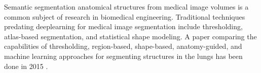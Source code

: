 
Semantic segmentation anatomical structures from medical image volumes is a common subject of research in biomedical engineering. Traditional techniques predating deeplearning for medical image segmentation include thresholding, atlas-based segmentation, and statistical shape modeling. A paper comparing the capabilities of thresholding, region-based, shape-based, anatomy-guided, and machine learning approaches for segmenting structures in the lungs has been done in 2015 \cite{comparison:article_typical}.